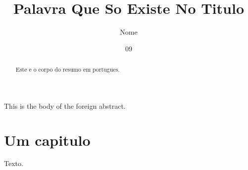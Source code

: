 \documentclass[dsc]{ufrj}
\title{Palavra Que So Existe No Titulo}
\author{Nome}{Sobrenome}
\date{09}{2026}
\begin{document}
  \maketitle
  \frontmatter
  \begin{abstract}Este e o corpo do resumo em portugues.\end{abstract}
  \begin{foreignabstract}This is the body of the foreign abstract.\end{foreignabstract}
  \tableofcontents
  \mainmatter
  \chapter{Um capitulo}
  Texto.
\end{document}
